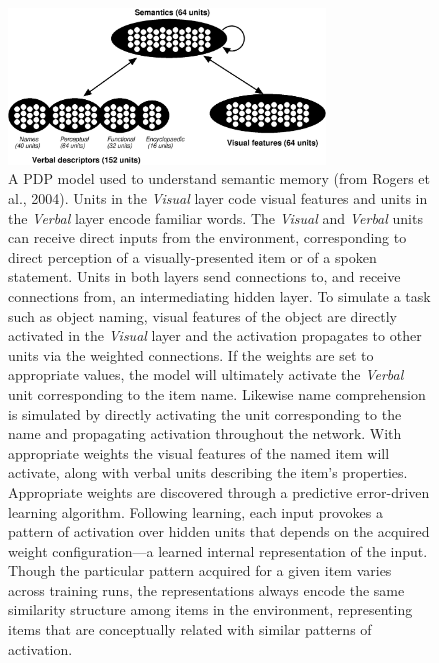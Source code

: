\begin{figure}
\centering
\includegraphics[width=0.75\textwidth]{figures/figure1.eps}
\caption{\label{fig.sem_net} A PDP model used to understand semantic memory (from Rogers et al., 2004). Units in the {\em Visual} layer code visual features and units in the {\em Verbal} layer encode familiar words. The {\em Visual} and {\em Verbal} units can receive direct inputs from the environment, corresponding to direct perception of a visually-presented item or of a spoken statement. Units in both layers send connections to, and receive connections from, an intermediating hidden layer. To simulate a task such as object naming, visual features of the object are directly activated in the {\em Visual} layer and the activation propagates to other units via the weighted connections. If the weights are set to appropriate values, the model will ultimately activate the {\em Verbal} unit corresponding to the item name. Likewise name comprehension is simulated by directly activating the unit corresponding to the name and propagating activation throughout the network. With appropriate weights the visual features of the named item will activate, along with verbal units describing the item's properties.  Appropriate weights are discovered through a predictive error-driven  learning algorithm. Following learning, each input provokes a pattern of activation over hidden units that depends on the acquired weight configuration---a learned internal representation of the input. Though the particular pattern acquired for a given item varies across training runs, the representations always encode the same similarity structure among items in the environment, representing items that are conceptually related with similar patterns of activation.}
\end{figure}


